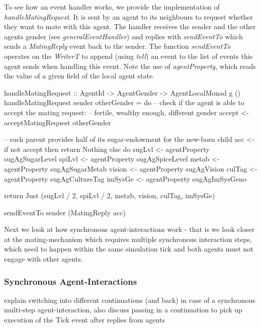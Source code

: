 To see how an event handler works, we provide the implementation of \textit{handleMatingRequest}. It is sent by an agent to its neighbours to request whether they want to mate with this agent. The handler receives the sender and the other agents gender (see \textit{generalEventHandler}) and replies with \textit{sendEventTo} which sends a \textit{MatingReply} event back to the sender. The function \textit{sendEventTo} operates on the \textit{WriterT} to append (using \textit{tell}) an event to the list of events this agent sends when handling this event. Note the use of \textit{agentProperty}, which reads the value of a given field of the local agent state. 

\begin{HaskellCode}
handleMatingRequest :: AgentId
                    -> AgentGender
                    -> AgentLocalMonad g ()
handleMatingRequest sender otherGender = do
  -- check if the agent is able to accept the mating request: 
  -- fertile, wealthy enough, different gender
  accept <- acceptMatingRequest otherGender

  -- each parent provides half of its sugar-endowment for the new-born child
  acc <- if not accept
      then return Nothing
      else do
        sugLvl  <- agentProperty sugAgSugarLevel
        spiLvl  <- agentProperty sugAgSpiceLevel
        metab   <- agentProperty sugAgSugarMetab
        vision  <- agentProperty sugAgVision
        culTag  <- agentProperty sugAgCultureTag
        imSysGe <- agentProperty sugAgImSysGeno

        return Just (sugLvl / 2, spiLvl / 2, metab, vision, culTag, imSysGe)

  sendEventTo sender (MatingReply acc)
\end{HaskellCode}

Next we look at how synchronous agent-interactions work - that is we look closer at the mating-mechanism which requires multiple synchronous interaction steps, which need to happen within the same simulation tick and both agents must not engage with other agents.

\subsubsection{Synchronous Agent-Interactions}
explain switching into different continuations (and back) in case of a synchronous multi-step agent-interaction, also discuss passing in a continuation to pick up execution of the Tick event after replies from agents

